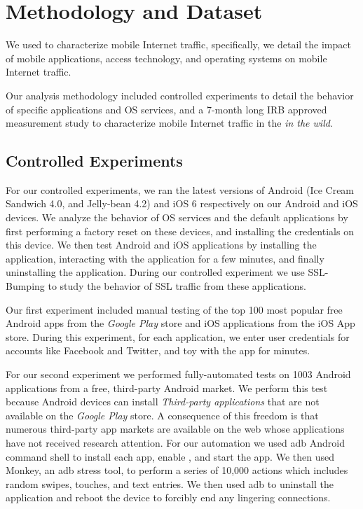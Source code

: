 \section{Methodology and Dataset}
\label{sec:Methodology}

We used \platname to characterize mobile Internet traffic, specifically, we detail the impact of mobile applications, access technology, and operating systems on mobile Internet traffic.

Our analysis methodology included controlled experiments to detail the behavior of specific applications and OS services, and a 7-month long IRB approved measurement study to characterize mobile Internet traffic in the \emph{in the wild}.

\subsection{Controlled Experiments}

For our controlled experiments, we ran the latest versions of Android (Ice Cream Sandwich 4.0, and Jelly-bean 4.2) and iOS 6 respectively on our Android and iOS devices. 
We analyze the behavior of OS services and the default applications by first performing a factory reset on these devices, and installing the \platname credentials on this device.
We then test Android and iOS applications by installing the application, interacting with the application for a few minutes, and finally uninstalling the  application. 
During our controlled experiment we use SSL-Bumping to study the behavior of SSL traffic from these applications. 

Our first experiment included manual testing of the top 100 most popular free Android apps from the \emph{Google Play} store and \tbd{} iOS applications from the iOS App store.
During this experiment, for each application, we enter user credentials for accounts like Facebook and Twitter, and toy with the app for \tbd{} minutes. 

For our second experiment we performed fully-automated tests on 1003 Android applications from a free, third-party Android market.
We perform this test because Android devices can install \emph{Third-party applications} that are not available on the \emph{Google Play} store.
A consequence of this freedom is that numerous third-party app markets are available on the web whose applications have not received research attention.
For our automation we used adb Android command shell to install each app, enable \platname, and start the app.
We then used Monkey, an adb stress tool, to perform a series of 10,000 actions which includes random swipes, touches, and text entries.
We then used adb to uninstall the application and reboot the device to forcibly end any lingering connections.

